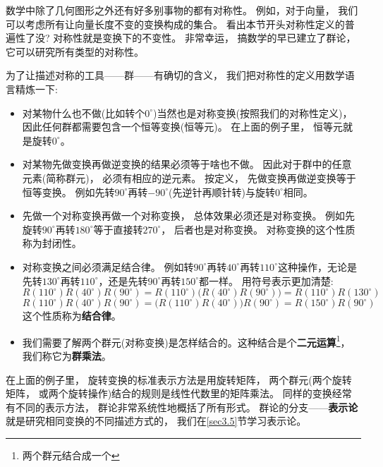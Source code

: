 数学中除了几何图形之外还有好多别事物的都有对称性。 例如，对于向量， 我们可以考虑所有让向量长度不变的变换构成的集合。 看出本节开头对称性定义的普遍性了没? 对称性就是变换下的不变性。 非常幸运， 搞数学的早已建立了群论， 它可以研究所有类型的对称性。

为了让描述对称的工具——群——有确切的含义， 我们把对称性的定义用数学语言精炼一下:
\begin{itemize}
	\item 对某物什么也不做(比如转个$0^\circ$)当然也是对称变换(按照我们的对称性定义)， 因此任何群都需要包含一个恒等变换(恒等元)。 在上面的例子里， 恒等元就是旋转$0^\circ$。

	\item 对某物先做变换再做逆变换的结果必须等于啥也不做。 因此对于群中的任意元素(简称群元)， 必须有相应的逆元素。 按定义， 先做变换再做逆变换等于恒等变换。 例如先转$90^\circ$再转$-90^\circ$(先逆针再顺针转)与旋转$0^\circ$相同。

	\item 先做一个对称变换再做一个对称变换， 总体效果必须还是对称变换。 例如先旋转$90^\circ$再转$180^\circ$等于直接转$270^\circ$， 后者也是对称变换。 对称变换的这个性质称为封闭性。

	\item 对称变换之间必须满足结合律。 例如转$90^\circ$再转$40^\circ$再转$110^\circ$这种操作，无论是先转$130^\circ$再转$110^\circ$，还是先转$90^\circ$再转$150^\circ$都一样。 用符号表示更加清楚:
	\begin{equation}\label{equ3.1}
	R(110^\circ) R(40^\circ) R(90^\circ) = R(110^\circ)\bigg( R(40^\circ)R(90^\circ) \bigg) = R(110^\circ) R(130^\circ)
	\end{equation}
	\begin{equation}\label{equ3.2}
	R(110^\circ) R(40^\circ) R(90^\circ) = \bigg( R(110^\circ) R(40^\circ) \bigg) R(90^\circ) = R(150^\circ) R(90^\circ)
	\end{equation}
	这个性质称为{\bfseries 结合律}。

	\item 我们需要了解两个群元(对称变换)是怎样结合的。这种结合是个{\bfseries 二元运算}\footnote{两个群元结合成一个}， 我们称它为{\bfseries 群乘法}。
\end{itemize}

	在上面的例子里， 旋转变换的标准表示方法是用旋转矩阵， 两个群元(两个旋转矩阵， 或两个旋转操作)结合的规则是线性代数里的矩阵乘法。 同样的变换经常有不同的表示方法， 群论非常系统性地概括了所有形式。 群论的分支——{\bfseries 表示论}就是研究相同变换的不同描述方式的， 我们在\ref{sec3.5}节学习表示论。

